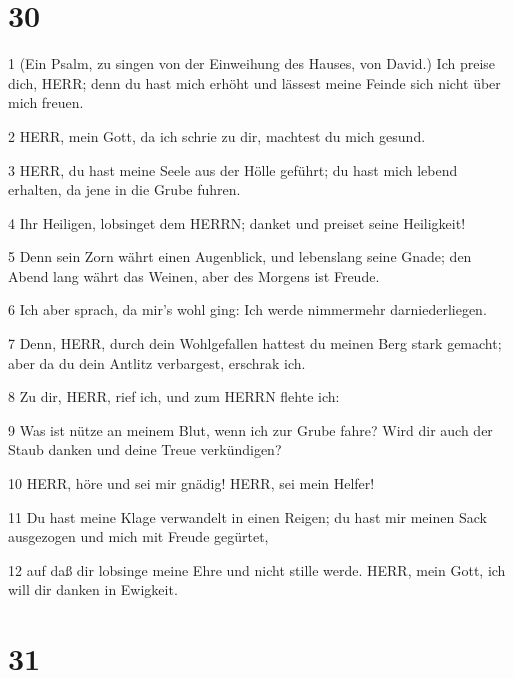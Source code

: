 \chapter{30}

\par 1 (Ein Psalm, zu singen von der Einweihung des Hauses, von David.) Ich preise dich, HERR; denn du hast mich erhöht und lässest meine Feinde sich nicht über mich freuen.
\par 2 HERR, mein Gott, da ich schrie zu dir, machtest du mich gesund.
\par 3 HERR, du hast meine Seele aus der Hölle geführt; du hast mich lebend erhalten, da jene in die Grube fuhren.
\par 4 Ihr Heiligen, lobsinget dem HERRN; danket und preiset seine Heiligkeit!
\par 5 Denn sein Zorn währt einen Augenblick, und lebenslang seine Gnade; den Abend lang währt das Weinen, aber des Morgens ist Freude.
\par 6 Ich aber sprach, da mir's wohl ging: Ich werde nimmermehr darniederliegen.
\par 7 Denn, HERR, durch dein Wohlgefallen hattest du meinen Berg stark gemacht; aber da du dein Antlitz verbargest, erschrak ich.
\par 8 Zu dir, HERR, rief ich, und zum HERRN flehte ich:
\par 9 Was ist nütze an meinem Blut, wenn ich zur Grube fahre? Wird dir auch der Staub danken und deine Treue verkündigen?
\par 10 HERR, höre und sei mir gnädig! HERR, sei mein Helfer!
\par 11 Du hast meine Klage verwandelt in einen Reigen; du hast mir meinen Sack ausgezogen und mich mit Freude gegürtet,
\par 12 auf daß dir lobsinge meine Ehre und nicht stille werde. HERR, mein Gott, ich will dir danken in Ewigkeit.

\chapter{31}

